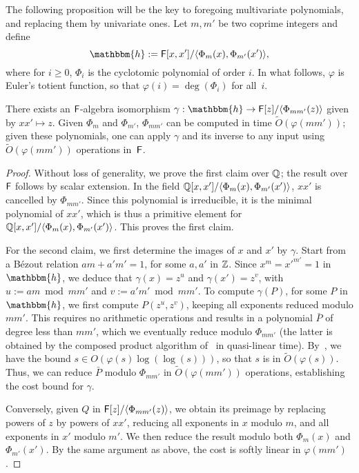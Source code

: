 The following proposition will be the key to foregoing multivariate
polynomials, and replacing them by univariate ones.  Let $m,m'$ be two
coprime integers and define
$$\mathbbm{h}:=\F[x,x']/\langle \Phi_{m}(x), \Phi_{m'}(x')\rangle,$$
where for $i \ge 0$, $\Phi_i$ is the cyclotomic polynomial of order
$i$. In what follows, $\varphi$ is Euler's totient function, so that
$\varphi(i) = \deg(\Phi_i)$ for all~$i$.
\begin{lemma}
  There exists an ${\mathsf{F}}$-algebra isomorphism $\gamma: \mathbbm{h} \to
  \F[z]/\langle\Phi_{mm'}(z)\rangle$ given by $xx' \mapsto z$.  Given
  $\Phi_m$ and $\Phi_{m'}$, $\Phi_{mm'}$ can be computed in time
  $\tilde{O}(\varphi(mm'))$; given these polynomials, one can
  apply $\gamma$ and its inverse to any input using
  $\tilde{O}(\varphi(mm'))$ operations in~${\mathsf{F}}$.
\end{lemma}
\begin{proof}
  Without loss of generality, we prove the first claim over $\mathbb{Q}$; the
  result over ${\mathsf{F}}$ follows by scalar extension. In the field \sloppy
  $\mathbb{Q}[x,x']/\langle \Phi_{m}(x), \Phi_{m'}(x')\rangle$, $xx'$ is
  cancelled by $\Phi_{mm'}$. Since this polynomial is irreducible, it
  is the minimal polynomial of $xx'$, which is thus a primitive
  element for $\mathbb{Q}[x,x']/\langle \Phi_{m}(x),
  \Phi_{m'}(x')\rangle$. This proves the first claim.

  For the second claim, we first determine the images of $x$ and $x'$
  by $\gamma$. Start from a B\'ezout relation $am+ a'm'=1$, for some
  $a,a'$ in $\mathbb{Z}$.  Since $x^m = {x'}^{m'}=1$ in $\mathbbm{h}$, we
  deduce that $\gamma(x)=z^{u}$ and $\gamma(x') = z^{v}$, with $u:=am
  \bmod mm'$ and $v:=a'm' \bmod mm'$. To compute $\gamma(P)$, for some
  $P$ in $\mathbbm{h}$, we first compute $P(z^u, z^v)$, keeping all
  exponents reduced modulo $mm'$. This requires no arithmetic
  operations and results in a polynomial $\bar P$ of degree less than
  $mm'$, which we eventually reduce modulo $\Phi_{mm'}$ (the latter is
  obtained by the composed product algorithm of~\cite{BoFlSaSc06} in
  quasi-linear time).  By~\cite[Theorem~8.8.7]{BacSha96}, we have the
  bound $s \in O(\varphi(s) \log(\log(s)))$, so that $s$ is in
  $\tilde{O}(\varphi(s))$. Thus, we can reduce $\bar P$ modulo
  $\Phi_{mm'}$ in $\tilde{O}(\varphi(mm'))$ operations, establishing
  the cost bound for $\gamma$.

  Conversely, given $Q$ in ${\mathsf{F}}[z]/\langle\Phi_{mm'}(z)\rangle$, we obtain
  its preimage by replacing powers of $z$ by powers of $xx'$, reducing all
  exponents in $x$ modulo $m$, and all exponents in $x'$ modulo $m'$.  We
  then reduce the result modulo both $\Phi_m(x)$ and $\Phi_{m'}(x')$.  By
  the same argument as above, the cost is softly linear in $\varphi(mm')$.
\end{proof}

